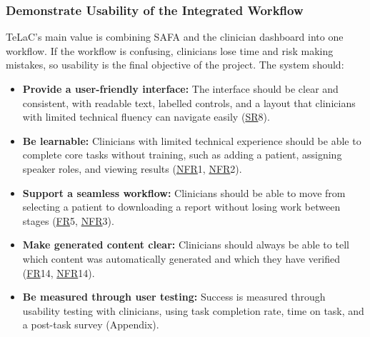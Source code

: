 \documentclass[12pt, titlepage]{article}
\newcommand{\srsfr}[1]{\href{https://github.com/Nour-Fawaz/MacaBoca/blob/main/pdfs/SRS/SRS.pdf}{FR}}
\newcommand{\srsnfr}[1]{\href{https://github.com/Nour-Fawaz/MacaBoca/blob/main/pdfs/SRS/SRS.pdf}{NFR}}
\newcommand{\srssr}[1]{\href{https://github.com/Nour-Fawaz/MacaBoca/blob/main/pdfs/SRS/SRS.pdf}{SR}}
\renewcommand{\_}{\oldunderscore\allowbreak}
\begin{document}
\subsubsection{Demonstrate Usability of the Integrated Workflow}
TeLaC's main value is combining SAFA and the clinician dashboard into one workflow. If the workflow is confusing, clinicians lose time and risk making mistakes, so usability is the final objective of the project. The system should:
\begin{itemize}
  \item \textbf{Provide a user-friendly interface:} The interface should be clear and consistent, with readable text, labelled controls, and a layout that clinicians with limited technical fluency can navigate easily (\srssr*{8}).
  \item \textbf{Be learnable:} Clinicians with limited technical experience should be able to complete core tasks without training, such as adding a patient, assigning speaker roles, and viewing results (\srsnfr*{1}, \srsnfr*{2}).
  \item \textbf{Support a seamless workflow:} Clinicians should be able to move from selecting a patient to downloading a report without losing work between stages (\srsfr*{5}, \srsnfr*{3}).
  \item \textbf{Make generated content clear:} Clinicians should always be able to tell which content was automatically generated and which they have verified (\srsfr*{14}, \srsnfr*{14}).
  \item \textbf{Be measured through user testing:} Success is measured through usability testing with clinicians, using task completion rate, time on task, and a post-task survey (Appendix).
\end{itemize}
\end{document}
